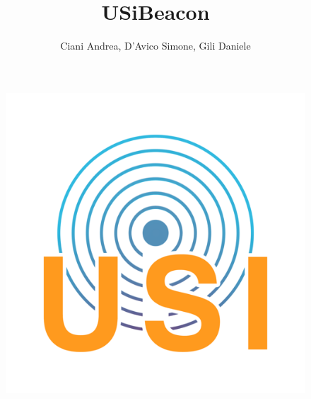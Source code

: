 \documentclass[11pt, oneside]{article}   	%
\title{USiBeacon}
\author{Ciani Andrea, D'Avico Simone, Gili Daniele}
\begin{document}
\maketitle
\begin{figure}[htbp]
\begin{center}
\includegraphics[scale=0.5]{img/logo.png}
\end{center}
\end{figure}

\pagebreak
\tableofcontents




\pagebreak


\pagebreak


\pagebreak

\pagebreak


\pagebreak

\end{document}
